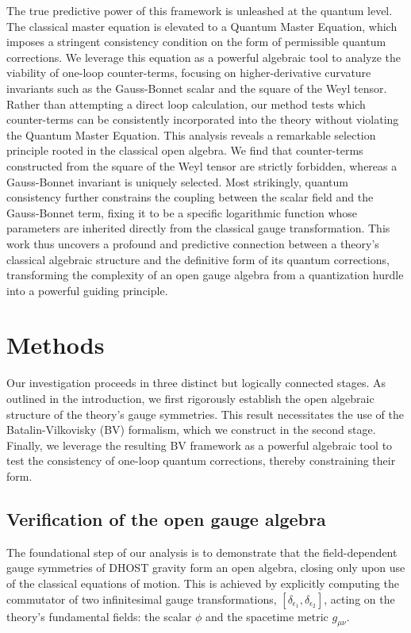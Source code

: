 \documentclass[twocolumn]{aastex631}
\begin{document}
The true predictive power of this framework is unleashed at the quantum level. The classical master equation is elevated to a Quantum Master Equation, which imposes a stringent consistency condition on the form of permissible quantum corrections. We leverage this equation as a powerful algebraic tool to analyze the viability of one-loop counter-terms, focusing on higher-derivative curvature invariants such as the Gauss-Bonnet scalar and the square of the Weyl tensor. Rather than attempting a direct loop calculation, our method tests which counter-terms can be consistently incorporated into the theory without violating the Quantum Master Equation. This analysis reveals a remarkable selection principle rooted in the classical open algebra. We find that counter-terms constructed from the square of the Weyl tensor are strictly forbidden, whereas a Gauss-Bonnet invariant is uniquely selected. Most strikingly, quantum consistency further constrains the coupling between the scalar field and the Gauss-Bonnet term, fixing it to be a specific logarithmic function whose parameters are inherited directly from the classical gauge transformation. This work thus uncovers a profound and predictive connection between a theory's classical algebraic structure and the definitive form of its quantum corrections, transforming the complexity of an open gauge algebra from a quantization hurdle into a powerful guiding principle.

\section{Methods}
\label{sec:methods}
Our investigation proceeds in three distinct but logically connected stages. As outlined in the introduction, we first rigorously establish the open algebraic structure of the theory's gauge symmetries. This result necessitates the use of the Batalin-Vilkovisky (BV) formalism, which we construct in the second stage. Finally, we leverage the resulting BV framework as a powerful algebraic tool to test the consistency of one-loop quantum corrections, thereby constraining their form.

\subsection{Verification of the open gauge algebra}
The foundational step of our analysis is to demonstrate that the field-dependent gauge symmetries of DHOST gravity form an open algebra, closing only upon use of the classical equations of motion. This is achieved by explicitly computing the commutator of two infinitesimal gauge transformations, $[\delta_{\epsilon_1}, \delta_{\epsilon_2}]$, acting on the theory's fundamental fields: the scalar $\phi$ and the spacetime metric $g_{\mu\nu}$.
\end{document}
